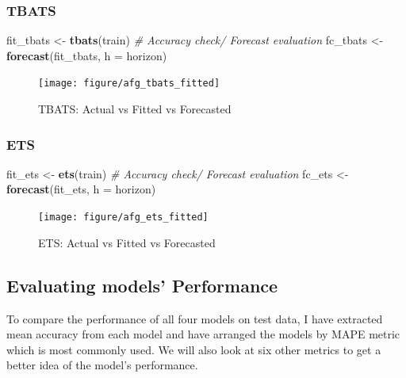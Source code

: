 \documentclass[11pt,oneside,a4paper]{reedthesis}
\newenvironment{Shaded}{\begin{snugshade}}{\end{snugshade}}
\newcommand{\KeywordTok}[1]{\textcolor[rgb]{0.13,0.29,0.53}{\textbf{#1}}}
\newcommand{\DataTypeTok}[1]{\textcolor[rgb]{0.13,0.29,0.53}{#1}}
\newcommand{\StringTok}[1]{\textcolor[rgb]{0.31,0.60,0.02}{#1}}
\newcommand{\CommentTok}[1]{\textcolor[rgb]{0.56,0.35,0.01}{\textit{#1}}}
\newcommand{\NormalTok}[1]{#1}
\begin{document}
\subsubsection{TBATS}\label{tbats}
\begin{Shaded}
\begin{Highlighting}[]
\NormalTok{fit_tbats <-}\StringTok{ }\KeywordTok{tbats}\NormalTok{(train)}
\CommentTok{# Accuracy check/ Forecast evaluation }
\NormalTok{fc_tbats <-}\StringTok{ }\KeywordTok{forecast}\NormalTok{(fit_tbats, }\DataTypeTok{h =}\NormalTok{ horizon)}
\end{Highlighting}
\end{Shaded}
\begin{figure}
\texttt{[image: figure/afg\_tbats\_fitted]} \caption{TBATS: Actual vs Fitted vs Forecasted}\label{fig:unnamed-chunk-68}
\end{figure}
\vspace{36pt}

\subsubsection{ETS}\label{ets}
\begin{Shaded}
\begin{Highlighting}[]
\NormalTok{fit_ets <-}\StringTok{ }\KeywordTok{ets}\NormalTok{(train)}
\CommentTok{# Accuracy check/ Forecast evaluation }
\NormalTok{fc_ets <-}\StringTok{ }\KeywordTok{forecast}\NormalTok{(fit_ets, }\DataTypeTok{h =}\NormalTok{ horizon)}
\end{Highlighting}
\end{Shaded}
\begin{figure}
\texttt{[image: figure/afg\_ets\_fitted]} \caption{ETS: Actual vs Fitted vs Forecasted}\label{fig:unnamed-chunk-70}
\end{figure}
\subsection{Evaluating models'
Performance}\label{evaluating-models-performance}

To compare the performance of all four models on test data, I have
extracted mean accuracy from each model and have arranged the models by
MAPE metric which is most commonly used. We will also look at six other
metrics to get a better idea of the model's performance.
\end{document}

